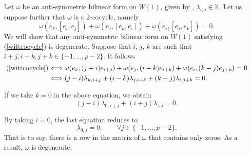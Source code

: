 \documentclass[10pt,a4paper]{amsart}
\numberwithin{equation}{section}
\begin{document}
Let $\omega$ be an anti-symmetric bilinear form on $W(1)$, given by , $\lambda_{i,j}\in\mathbb{K}$. Let us suppose further that $\omega$ is a $2$-cocycle, namely
\begin{equation}\label{wittcocycle}
 \omega(e_k,[e_i,e_j])+\omega(e_j,[e_k,e_i])+\omega(e_i,[e_j,e_k])=0.
\end{equation}
We will show that any anti-symmetric bilinear form on $W(1)$ satisfying (\ref{wittcocycle}) is degenerate. Suppose that $i$, $j$, $k$ are such that $i+j, i+k, j+k \in\{-1,\dots ,p-2\}.$ It follows
\begin{align*}
(\ref{wittcocycle})&\Longleftrightarrow \omega(e_k,(j-i)e_{i+j})+ \omega(e_j,(i-k)e_{i+k})+ \omega(e_i,(k-j)e_{j+k})=0\\
 &\Longleftrightarrow (j-i)\lambda_{k,i+j}+(i-k)\lambda_{j,i+k}+(k-j)\lambda_{i,j+k}=0.
\end{align*}

If we take $k=0$ in the above equation, we obtain
\[
 (j-i)\lambda_{0,i+j}+(i+j)\lambda_{i,j}=0.
\]

By taking $i=0$, the last equation reduces to
\[
 \lambda_{0,j}=0,\qquad \forall j\in\{-1,\dots ,p-2\}.
\]
That is to say, there is a row in the matrix of $\omega$ that contains only zeros. As a result, $\omega$ is degenerate.
\end{document}
